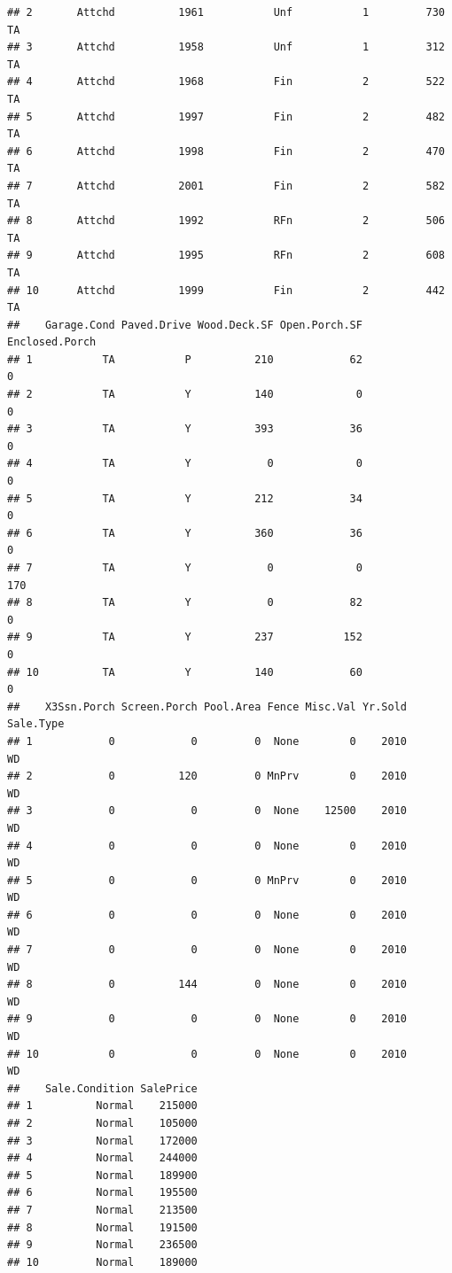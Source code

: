 \documentclass[
]{article}
\begin{document}
\begin{verbatim}
## 2       Attchd          1961           Unf           1         730          TA
## 3       Attchd          1958           Unf           1         312          TA
## 4       Attchd          1968           Fin           2         522          TA
## 5       Attchd          1997           Fin           2         482          TA
## 6       Attchd          1998           Fin           2         470          TA
## 7       Attchd          2001           Fin           2         582          TA
## 8       Attchd          1992           RFn           2         506          TA
## 9       Attchd          1995           RFn           2         608          TA
## 10      Attchd          1999           Fin           2         442          TA
##    Garage.Cond Paved.Drive Wood.Deck.SF Open.Porch.SF Enclosed.Porch
## 1           TA           P          210            62              0
## 2           TA           Y          140             0              0
## 3           TA           Y          393            36              0
## 4           TA           Y            0             0              0
## 5           TA           Y          212            34              0
## 6           TA           Y          360            36              0
## 7           TA           Y            0             0            170
## 8           TA           Y            0            82              0
## 9           TA           Y          237           152              0
## 10          TA           Y          140            60              0
##    X3Ssn.Porch Screen.Porch Pool.Area Fence Misc.Val Yr.Sold Sale.Type
## 1            0            0         0  None        0    2010       WD 
## 2            0          120         0 MnPrv        0    2010       WD 
## 3            0            0         0  None    12500    2010       WD 
## 4            0            0         0  None        0    2010       WD 
## 5            0            0         0 MnPrv        0    2010       WD 
## 6            0            0         0  None        0    2010       WD 
## 7            0            0         0  None        0    2010       WD 
## 8            0          144         0  None        0    2010       WD 
## 9            0            0         0  None        0    2010       WD 
## 10           0            0         0  None        0    2010       WD 
##    Sale.Condition SalePrice
## 1          Normal    215000
## 2          Normal    105000
## 3          Normal    172000
## 4          Normal    244000
## 5          Normal    189900
## 6          Normal    195500
## 7          Normal    213500
## 8          Normal    191500
## 9          Normal    236500
## 10         Normal    189000
\end{verbatim}
\end{document}
